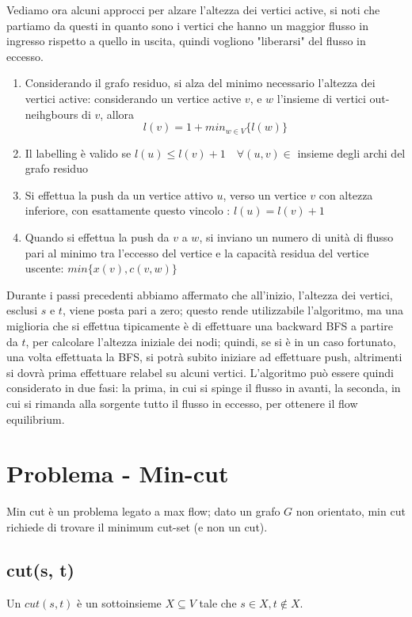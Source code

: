 \documentclass[12pt,a4paper]{article}
\begin{document}
Vediamo ora alcuni approcci per alzare l'altezza dei vertici active, si noti che partiamo da questi in quanto sono i vertici che hanno un maggior flusso in ingresso rispetto a quello in uscita, quindi vogliono "liberarsi" del flusso in eccesso.
\begin{enumerate}
\item Considerando il grafo residuo, si alza del minimo necessario l'altezza dei vertici active: considerando un vertice active $v$, e $w$ l'insieme di vertici out-neihgbours di $v$, allora $$l(v) = 1 + min_{w \in V} \lbrace l(w) \rbrace$$
\item Il labelling è valido se $l(u) \leq l(v) + 1 \quad  \forall (u, v) \in$ {insieme degli archi del grafo residuo}
\item Si effettua la push da un vertice attivo $u$, verso un vertice $v$ con altezza inferiore, con esattamente questo vincolo : $l(u) = l(v) + 1$
\item Quando si effettua la push da $v$ a $w$, si inviano un numero di unità di flusso pari al minimo tra l'eccesso del vertice e la capacità residua del vertice uscente: $min \lbrace x(v), c(v, w) \rbrace $
\end{enumerate}
Durante i passi precedenti abbiamo affermato che all'inizio, l'altezza dei vertici, esclusi $s$ e $t$, viene posta pari a zero; questo rende utilizzabile l'algoritmo, ma una miglioria che si effettua tipicamente è di effettuare una backward BFS a partire da $t$, per calcolare l'altezza iniziale dei nodi; quindi, se si è in un caso fortunato, una volta effettuata la BFS, si potrà subito iniziare ad effettuare push, altrimenti si dovrà prima effettuare relabel su alcuni vertici. L'algoritmo può essere quindi considerato in due fasi: la prima, in cui si spinge il flusso in avanti, la seconda, in cui si rimanda alla sorgente tutto il flusso in eccesso, per ottenere il flow equilibrium.

\pagebreak
\section{Problema - Min-cut}
Min cut è un problema legato a max flow; dato un grafo $G$ non orientato, min cut richiede di trovare il minimum cut-set (e non un cut).

\subsection{cut(s, t)}
Un $cut(s, t)$ è un sottoinsieme $X \subseteq V$ tale che $s \in X, t \notin X$.
\end{document}
